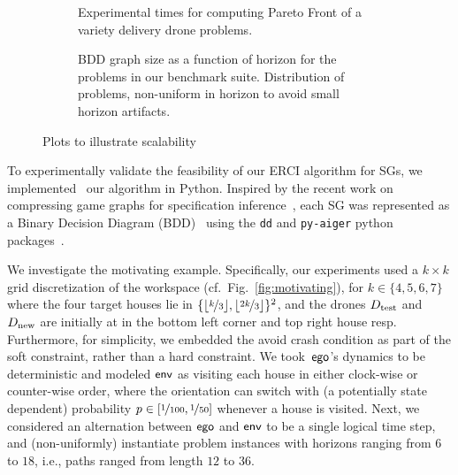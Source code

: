 \begin{figure*}
    \begin{subfigure}{0.47\textwidth}
  \centering
  \scalebox{0.50}{
    
    }
    \caption{
      Experimental times for computing Pareto Front of a variety
      delivery drone problems\label{fig:exp_times}.
    }
  \end{subfigure}
  \hfill
    \begin{subfigure}{0.47\textwidth}
    \centering \scalebox{0.53}{
      
    }
    \caption{
      BDD graph size as a function of horizon for the problems in our
      benchmark suite. Distribution of problems, non-uniform in horizon
      to avoid small horizon artifacts\label{fig:bdd_sizes}.
    }
  \end{subfigure}
  \caption{Plots to illustrate scalability} 
\end{figure*}

 To experimentally validate the feasibility of our ERCI
algorithm for SGs, we implemented~\cite{RSS21code} our algorithm in
Python.  Inspired by the recent work on compressing
game graphs for specification
inference~\cite{DBLP:conf/cav/Vazquez-Chanlatte20}, each SG was
represented as a Binary Decision Diagram
(BDD)~\cite{DBLP:journals/csur/Bryant92} using the \texttt{dd} and
\texttt{py-aiger} python packages~\cite{dd, pyAiger}.

We investigate the motivating example.
Specifically, our experiments used
a $k\times k$ grid discretization of the workspace (cf.\ Fig.~\ref{fig:motivating}), for $k \in
\{4,5,6,7\}$ where the four target houses lie in
$\{\lfloor\nicefrac{k}{3}\rfloor, \lfloor\nicefrac{2k}{3}\rfloor
\}^2$, and the drones ${D_{\text{test}}}$ and ${D_{\text{new}}}$ are initially at in the bottom left corner and top right house resp. Furthermore, for simplicity, we embedded the avoid crash
condition as part of the soft constraint, rather than a hard
constraint\footnotemark. We took~$\mathsf{ego}$'s dynamics to be deterministic
and modeled $\mathsf{env}$ as visiting each house in either clock-wise or
counter-wise order, where the orientation can switch with
(a potentially state dependent) probability $p \in [\nicefrac{1}{100},
\nicefrac{1}{50}]$ whenever a house is visited. Next, we considered an
alternation between $\mathsf{ego}$ and $\mathsf{env}$ to be a single logical time
step, and (non-uniformly) instantiate problem instances with horizons
ranging from $6$ to $18$, i.e., paths ranged from length $12$ to
$36$.



